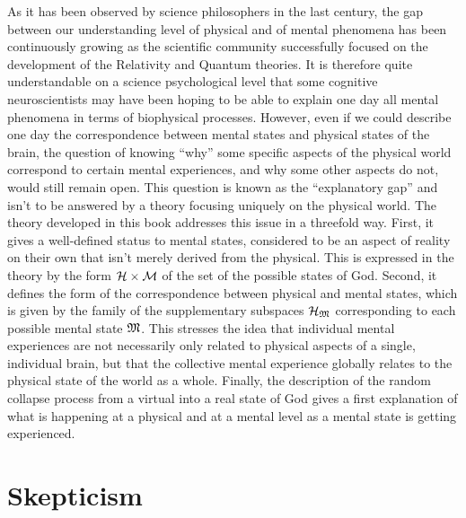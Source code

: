 \documentclass[10pt,a4paper,twoside,openany]{book}
\begin{document}
As it has been observed by science philosophers in the last century, the gap between our understanding level of physical and of mental phenomena has been continuously growing as the scientific community successfully focused on the development of the Relativity and Quantum theories. It is therefore quite understandable on a science psychological level that some cognitive neuroscientists may have been hoping to be able to explain one day all mental phenomena in terms of biophysical processes. However, even if we could describe one day the correspondence between mental states and physical states of the brain, the question of knowing ``why'' some specific aspects of the physical world correspond to certain mental experiences, and why some other aspects do not, would still remain open. This question is known as the ``explanatory gap'' and isn't to be answered by a theory focusing uniquely on the physical world. The theory developed in this book addresses this issue in a threefold way. First, it gives a well-defined status to mental states, considered to be an aspect of reality on their own that isn't merely derived from the physical. This is expressed in the theory by the form  $\mathcal H \times \mathcal M$ of the set of the possible states of God. Second, it defines the form of the correspondence between physical and mental states, which is given by the family of the supplementary subspaces $\mathcal H_{\mathfrak{M}}$ corresponding to each possible mental state $\mathfrak{M}$. This stresses the idea that individual mental experiences are not necessarily only related to physical aspects of a single, individual brain, but that the collective mental experience globally relates to the physical state of the world as a whole. Finally, the description of the random collapse process from a virtual into a real state of God gives a first explanation of what is happening at a physical and at a mental level as a mental state is getting experienced.

\section{Skepticism}
\end{document}
